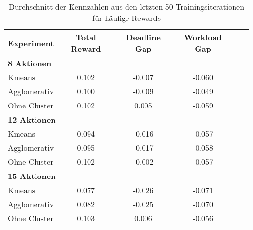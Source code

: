 \begin{table}[ht]
\centering
\begin{tabular}{lccccc}
\hline
\textbf{Experiment} & \textbf{Total Reward} & \textbf{Deadline Gap} & \textbf{Workload Gap} \\
\hline
\multicolumn{4}{l}{\textbf{8 Aktionen}} \\
\hspace{1em}Kmeans & 0.102 & -0.007 & -0.060 \\
\hspace{1em}Agglomerativ & 0.100 & -0.009 & -0.049 \\
\hspace{1em}Ohne Cluster & 0.102 & 0.005 & -0.059 \\
\hline
\multicolumn{4}{l}{\textbf{12 Aktionen}} \\
\hspace{1em}Kmeans & 0.094 & -0.016 & -0.057 \\
\hspace{1em}Agglomerativ & 0.095 & -0.017 & -0.058 \\
\hspace{1em}Ohne Cluster & 0.102 & -0.002 & -0.057 \\
\hline
\multicolumn{4}{l}{\textbf{15 Aktionen}} \\
\hspace{1em}Kmeans & 0.077 & -0.026 & -0.071 \\
\hspace{1em}Agglomerativ & 0.082 & -0.025 & -0.070 \\
\hspace{1em}Ohne Cluster & 0.103 & 0.006 & -0.056 \\
\hline
\end{tabular}
\caption{Durchschnitt der Kennzahlen aus den letzten 50 Trainingsiterationen für häufige Rewards}
\end{table}


